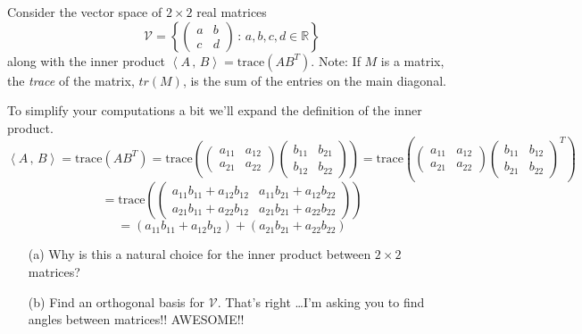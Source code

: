 \begin{problem}
    Consider the vector space of $2 \times 2$ real matrices 
    \[ \mathcal{V} = \left\{ \begin{pmatrix} a & b \\ c & d \end{pmatrix} \, : \,
    a,b,c,d \in \mathbb{R} \right\} \]
    along with the inner product $\left<A \,,\, B \right> = \text{trace}(AB^T)$.  
    Note: If $M$ is a matrix, the {\it trace} of the matrix, $tr(M)$, is the sum
    of the entries on the main diagonal.

    To
    simplify your computations a bit we'll expand the definition of the inner product.
    \[ \left<A\,,\,B\right> = \text{trace}(AB^T) = \text{trace}\left( 
        \begin{pmatrix} a_{11} & a_{12} \\ 
                        a_{21} & a_{22} \end{pmatrix} 
        \begin{pmatrix} b_{11} & b_{21} \\
        b_{12} & b_{22} \end{pmatrix} \right) = \text{trace}\left( 
        \begin{pmatrix} a_{11} & a_{12} \\ 
                        a_{21} & a_{22} \end{pmatrix} 
        \begin{pmatrix} b_{11} & b_{12} \\
        b_{21} & b_{22} \end{pmatrix}^T \right)\]
    \[ = \text{trace}\left(
                    \begin{pmatrix} a_{11}b_{11} + a_{12} b_{12} & a_{11}b_{21} +
                        a_{12}b_{22} \\ a_{21}b_{11} + a_{22}b_{12} & a_{21} b_{21} +
                    a_{22} b_{22} \end{pmatrix} \right) \]
    \[ = \left( a_{11}b_{11} + a_{12} b_{12} \right) + \left(  a_{21} b_{21} + a_{22}
    b_{22}\right) \]
    \begin{enumerate}
        \item[(a)] Why is this a natural choice for the inner product between $2 \times 2$ matrices?
        \item[(b)] Find an orthogonal basis for $\mathcal{V}$.  That's right \dots I'm asking you to find
            angles between matrices!! AWESOME!!
    \end{enumerate}
\end{problem}
